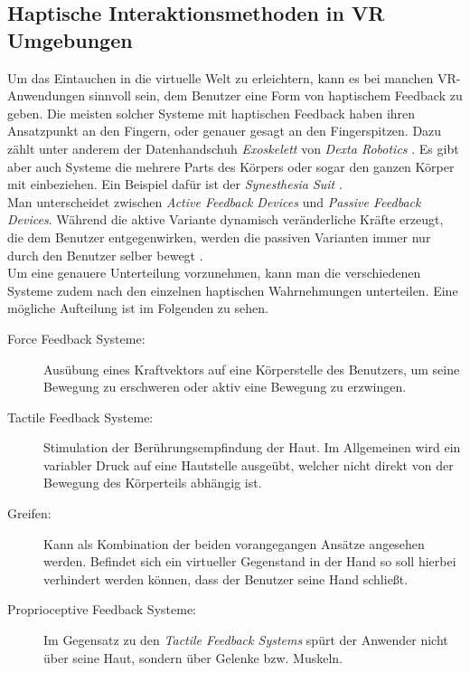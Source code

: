 \subsection{Haptische Interaktionsmethoden in VR Umgebungen}\label{sec:HaptikAnwendungen}
Um das Eintauchen in die virtuelle Welt zu erleichtern, kann es bei manchen VR-Anwendungen sinnvoll sein, dem Benutzer eine Form von haptischem Feedback zu geben. Die meisten solcher Systeme mit haptischen Feedback haben ihren Ansatzpunkt an den Fingern, oder genauer gesagt an den Fingerspitzen. Dazu zählt unter anderem der Datenhandschuh \textit{Exoskelett} von \textit{Dexta Robotics} \cite{Gu:2016:DIL:2858036.2858487}. Es gibt aber auch Systeme die mehrere Parts des Körpers oder sogar den ganzen Körper mit einbeziehen. Ein Beispiel dafür ist der \textit{Synesthesia Suit} \cite{Konishi:2016:SSF:2945078.2945149}. \\
Man unterscheidet zwischen \textit{Active Feedback Devices} und \textit{Passive Feedback Devices}. Während die aktive Variante dynamisch veränderliche Kräfte erzeugt, die dem Benutzer entgegenwirken, werden die passiven Varianten immer nur durch den Benutzer selber bewegt \cite{Haptic}.\\
Um eine genauere Unterteilung vorzunehmen, kann man die verschiedenen Systeme zudem nach den einzelnen haptischen Wahrnehmungen unterteilen. Eine mögliche Aufteilung ist im Folgenden zu sehen.

\begin{description}
	\item[Force Feedback Systeme:] Ausübung eines Kraftvektors auf eine Körperstelle des Benutzers, um seine Bewegung zu erschweren oder aktiv eine Bewegung zu erzwingen. 
	\item[Tactile Feedback Systeme:] Stimulation der Berührungsempfindung der Haut. Im Allgemeinen wird ein variabler Druck auf eine Hautstelle ausgeübt, welcher nicht direkt von der Bewegung des Körperteils abhängig ist.
	\item[Greifen:] Kann als Kombination der beiden vorangegangen Ansätze angesehen werden. Befindet sich ein virtueller Gegenstand in der Hand so soll hierbei verhindert werden können, dass der Benutzer seine Hand schließt. 
	\item[Proprioceptive Feedback Systeme:] Im Gegensatz zu den \textit{Tactile Feedback Systems} spürt der Anwender nicht über seine Haut, sondern über Gelenke bzw. Muskeln. 
\end{description}


